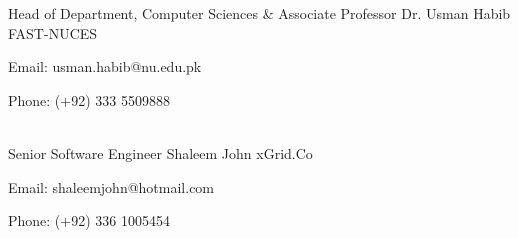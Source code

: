 


\begin{cvhonors}

\cventry
{Head of Department, Computer Sciences \& Associate Professor} %
{Dr. Usman Habib} %
{FAST-NUCES} %
{} %
{ %
\begin{cvitems}
\item {Email: usman.habib@nu.edu.pk}
\item{Phone: (+92) 333 5509888 }
\end{cvitems}
}

\\

\cventry
{Senior Software Engineer} %
{Shaleem John} %
{xGrid.Co} %
{} %
{ %
\begin{cvitems}
\item {Email: shaleemjohn@hotmail.com}
\item{Phone: (+92) 336 1005454 }
\end{cvitems}
}

\end{cvhonors}